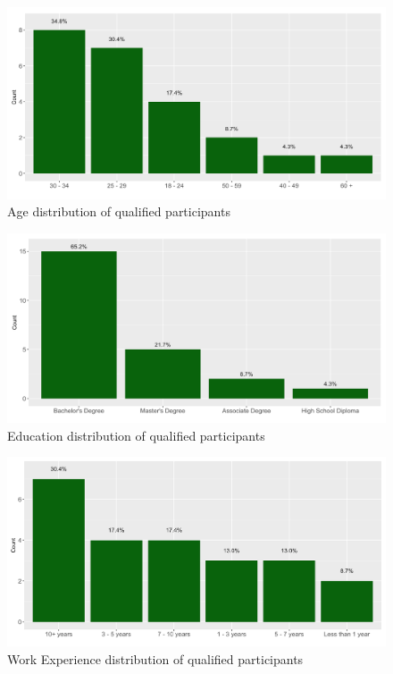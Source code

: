 \documentclass[letterpaper, 10 pt, conference]{ieeeconf}  %
\begin{document}
   \begin{figure}[!htb]
      \centering
      \includegraphics[scale=0.25]{Plots/AgePlot}
      \caption{Age distribution of qualified participants}
      \label{AgePlot}
   \end{figure}
   
   \begin{figure}[!htb]
      \centering
      \includegraphics[scale=0.25]{Plots/EducationPlot}
      \caption{Education distribution of qualified participants}
      \label{EducationPlot}
   \end{figure}
   
   \begin{figure}[!htb]
      \centering
      \includegraphics[scale=0.25]{Plots/WorkExperiencePlot}
      \caption{Work Experience distribution of qualified participants}
      \label{WEPlot}
   \end{figure}
   
\end{document}
